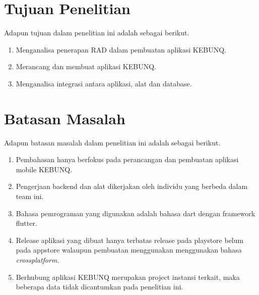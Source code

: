 \begin{flushleft}
\begin{enumerate}
  
\end{enumerate}
\vspace{2cm}

\section{Tujuan Penelitian}

\begin{justify}
  Adapun tujuan dalam penelitian ini adalah sebagai berikut.


\end{justify}
\begin{enumerate}
  \item Menganalisa penerapan RAD dalam pembuatan aplikasi KEBUNQ.
  \item Merancang dan membuat aplikasi KEBUNQ.
  \item Menganalisa integrasi antara aplikasi, alat dan database.
  
  \end{enumerate}
\vspace{2cm}

\section{Batasan Masalah}

\begin{justify}
  Adapun batasan masalah dalam penelitian ini adalah sebagai berikut.


\end{justify}
\begin{enumerate}
  \item Pembahasan hanya berfokus pada perancangan dan pembuatan aplikasi mobile KEBUNQ.
  \item Pengerjaan backend dan alat dikerjakan oleh individu yang berbeda dalam team ini.
  \item Bahasa pemrograman yang digunakan adalah bahasa dart dengan framework flutter.
  \item Release aplikasi yang dibuat hanya terbatas release pada playstore belum pada appstore walaupun pembuatan menggunakan menggunakan bahasa \textit{crossplatform}.
  \item Berhubung aplikasi KEBUNQ merupakan project instansi terkait, maka beberapa data tidak dicantumkan pada penelitian ini.

  \end{enumerate}
\vspace{2cm}



\end{flushleft}
